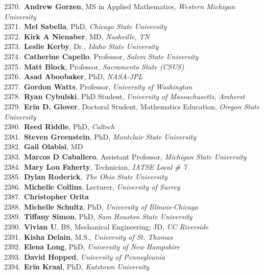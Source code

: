 2370.~{\bf Andrew Gorzen}, MS in Applied Mathematics, {\sl Western Michigan University} \\
2371.~{\bf Mel Sabella}, PhD, {\sl Chicago State University} \\
2372.~{\bf Kirk A Nienaber}, MD, {\sl Nashville, TN} \\
2373.~{\bf Leslie Kerby}, Dr., {\sl Idaho State University} \\
2374.~{\bf Catherine Capello}, Professor, {\sl Salem State University} \\
2375.~{\bf Matt Block}, Professor, {\sl Sacramento State (CSUS)} \\
2376.~{\bf Asad Aboobaker}, PhD, {\sl NASA-JPL} \\
2377.~{\bf Gordon Watts}, Professor, {\sl University of Washington} \\
2378.~{\bf Ryan Cybulski}, PhD Student, {\sl University of Massachusetts, Amherst} \\
2379.~{\bf Erin D. Glover}, Doctoral Student, Mathematics Education, {\sl Oregon State University} \\
2380.~{\bf Reed Riddle}, PhD, {\sl Caltech} \\
2381.~{\bf Steven Greenstein}, PhD, {\sl Montclair State University} \\
2382.~{\bf Gail Olabisi}, MD \\
2383.~{\bf Marcos D Caballero}, Assistant Professor, {\sl Michigan State University } \\
2384.~{\bf Mary Lou Faherty}, Technician, {\sl IATSE Local \# 7} \\
2385.~{\bf Dylan Roderick}, {\sl The Ohio State University } \\
2386.~{\bf Michelle Collins}, Lecturer, {\sl University of Surrey} \\
2387.~{\bf Christopher Orita} \\
2388.~{\bf Michelle Schultz}, PhD, {\sl University of Illinois-Chicago} \\
2389.~{\bf Tiffany Simon}, PhD, {\sl Sam Houston State University} \\
2390.~{\bf Vivian U}, BS, Mechanical Engineering; JD, {\sl UC Riverside} \\
2391.~{\bf Kisha Delain}, M.S., {\sl University of St. Thomas} \\
2392.~{\bf Elena Long}, PhD, {\sl University of New Hampshire} \\
2393.~{\bf David Hopped}, {\sl University of Pennsylvania } \\
2394.~{\bf Erin Kraal}, PhD, {\sl Kutztown University} \\
